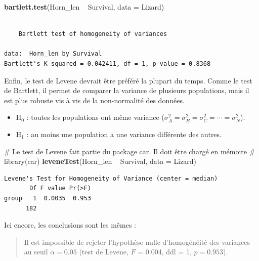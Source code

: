 \documentclass[
  a4paper,
]{article}
\newenvironment{Shaded}{\begin{snugshade}}{\end{snugshade}}
\newcommand{\CommentTok}[1]{\textcolor[rgb]{0.54,0.53,0.53}{#1}}
\newcommand{\DataTypeTok}[1]{\textcolor[rgb]{0.00,0.34,0.68}{#1}}
\newcommand{\KeywordTok}[1]{\textcolor[rgb]{0.12,0.11,0.11}{\textbf{#1}}}
\newcommand{\NormalTok}[1]{\textcolor[rgb]{0.12,0.11,0.11}{#1}}
\newcommand{\OperatorTok}[1]{\textcolor[rgb]{0.12,0.11,0.11}{#1}}
\newcommand{\StringTok}[1]{\textcolor[rgb]{0.75,0.01,0.01}{#1}}
\providecommand{\tightlist}{%
  \setlength{\itemsep}{0pt}\setlength{\parskip}{0pt}}
\begin{document}
\begin{Shaded}
\begin{Highlighting}[]
\KeywordTok{bartlett.test}\NormalTok{(Horn_len }\OperatorTok{~}\StringTok{ }\NormalTok{Survival, }\DataTypeTok{data =}\NormalTok{ Lizard)}
\end{Highlighting}
\end{Shaded}

\begin{verbatim}

    Bartlett test of homogeneity of variances

data:  Horn_len by Survival
Bartlett's K-squared = 0.042411, df = 1, p-value = 0.8368
\end{verbatim}

Enfin, le test de Levene devrait être préféré la plupart du temps. Comme le test de Bartlett, il permet de comparer la variance de plusieurs populations, mais il est plus robuste vis à vis de la non-normalité des données.

\begin{itemize}
\tightlist
\item
  H\(_0\) : toutes les populations ont même variance (\(\sigma^2_A = \sigma^2_B = \sigma^2_C = \cdots = \sigma^2_N\)).
\item
  H\(_1\) : au moins une population a une variance différente des autres.
\end{itemize}

\begin{Shaded}
\begin{Highlighting}[]
\CommentTok{# Le test de Levene fait partie du package car. Il doit être chargé en mémoire}
\CommentTok{# library(car)}
\KeywordTok{leveneTest}\NormalTok{(Horn_len }\OperatorTok{~}\StringTok{ }\NormalTok{Survival, }\DataTypeTok{data =}\NormalTok{ Lizard)}
\end{Highlighting}
\end{Shaded}

\begin{verbatim}
Levene's Test for Homogeneity of Variance (center = median)
       Df F value Pr(>F)
group   1  0.0035  0.953
      182               
\end{verbatim}

Ici encore, les conclusions sont les mêmes :

\begin{quote}
Il est impossible de rejeter l'hypothèse nulle d'homogénéité des variances au seuil \(\alpha = 0.05\) (test de Levene, \(F\) = 0.004, ddl = 1, \(p = 0.953\)).
\end{quote}
\end{document}
